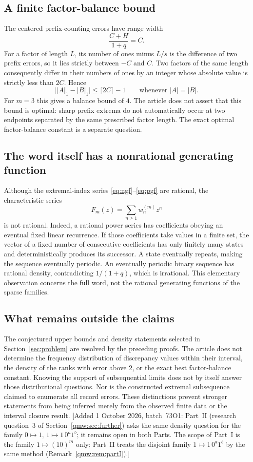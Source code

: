 \documentclass[11pt]{article}
\numberwithin{equation}{section}
\theoremstyle{definition}
\theoremstyle{remark}
\begin{document}
\subsection{A finite factor-balance bound}
The centered prefix-counting errors have range width
\[
\frac{C+H}{1+q}=C.
\]
For a factor of length $L$, its number of ones minus $L/s$ is the
difference of two prefix errors, so it lies strictly between $-C$ and
$C$. Two factors of the same length consequently differ in their numbers
of ones by an integer whose absolute value is strictly less than $2C$.
Hence
\begin{equation}\label{eq:balance-bound}
\bigl||A|_1-|B|_1\bigr|\le\lceil2C\rceil-1
\qquad\text{whenever }|A|=|B|.
\end{equation}
For $m=3$ this gives a balance bound of $4$. The article does not assert
that this bound is optimal: sharp prefix extrema do not automatically
occur at two endpoints separated by the same prescribed factor length.
The exact optimal factor-balance constant is a separate question.

\subsection{The word itself has a nonrational generating function}
Although the extremal-index series \eqref{eq:ngf}--\eqref{eq:pgf} are
rational, the characteristic series
\[
F_m(z)=\sum_{n\ge1}w^{(m)}_n z^n
\]
is not rational. Indeed, a rational power series has coefficients obeying
an eventual fixed linear recurrence. If those coefficients take values
in a finite set, the vector of a fixed number of consecutive coefficients
has only finitely many states and deterministically produces its successor.
A state eventually repeats, making the sequence eventually periodic.
An eventually periodic binary sequence has rational density, contradicting
$1/(1+q)$, which is irrational. This elementary observation concerns the
full word, not the rational generating functions of the sparse families.

\subsection{What remains outside the claims}
The conjectured upper bounds and density statements selected in
Section~\ref{sec:problem} are resolved by the preceding proofs. The
article does not determine the frequency distribution of discrepancy
values within their interval, the density of the ranks with error above
$2$, or the exact best factor-balance constant. Knowing the support of
subsequential limits does not by itself answer those distributional
questions. Nor is the constructed extremal subsequence claimed to enumerate
all record errors. These distinctions prevent stronger statements from
being inferred merely from the observed finite data or the interval
closure result.
[Added 1 October 2026, batch~73O1: Part~II (research question~3 of
Section~\ref{qmw:sec:further}) asks the same density question for the
family $0\mapsto1$, $1\mapsto1\,0^a1^b$; it remains open in both Parts. The
scope of Part~I is the family $1\mapsto(10)^m$ only; Part~II treats the
disjoint family $1\mapsto1\,0^a1^b$ by the same method
(Remark~\ref{qmw:rem:partI}).]
\end{document}
